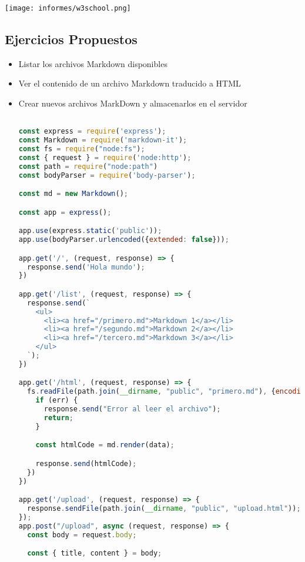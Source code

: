 \documentclass{article}
\begin{document}
        \texttt{[image: informes/w3school.png]}
        
	\subsection{Ejercicios Propuestos}
	\begin{itemize}	
 
		\item Listar los archivos Markdown disponibles
            \item Ver el contenido de un archivo Markdown traducido a HTML
            \item Crear nuevos archivos MarkDown y almacenarlos en el servidor


            \begin{lstlisting}[language=JavaScript, caption=EJERCICIOS PROPUESTOS]

const express = require('express');
const Markdown = require('markdown-it');
const fs = require("node:fs");
const { request } = require('node:http');
const path = require("node:path")
const bodyParser = require('body-parser');

const md = new Markdown();

const app = express();

app.use(express.static('public'));
app.use(bodyParser.urlencoded({extended: false}));

app.get('/', (request, response) => {
  response.send('Hola mundo');
})

app.get('/list', (request, response) => {
  response.send(`
    <ul>
      <li><a href="/primero.md">Markdown 1</a></li>
      <li><a href="/segundo.md">Markdown 2</a></li>
      <li><a href="/tercero.md">Markdown 3</a></li>
    </ul>
  `);
})

app.get('/html', (request, response) => {
  fs.readFile(path.join(__dirname, "public", "primero.md"), {encoding: "utf-8"}, (err, data) => {
    if (err) {
      response.send("Error al leer el archivo");
      return;
    }

    const htmlCode = md.render(data);

    response.send(htmlCode);
  })
})

app.get('/upload', (request, response) => {
  response.sendFile(path.join(__dirname, "public", "upload.html"));
});
app.post("/upload", async (request, response) => {
  const body = request.body;

  const { title, content } = body;


\end{lstlisting}
\end{itemize}
\end{document}
